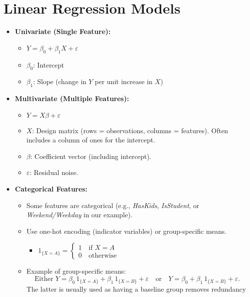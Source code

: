 \documentclass[10pt]{article}
\begin{document}
\section{Linear Regression Models}
\begin{itemize}
    \item \textbf{Univariate (Single Feature):}
    \begin{itemize}
        \item \(\displaystyle Y = \beta_{0} + \beta_{1} X + \varepsilon\)
        \item \(\beta_{0}\): Intercept
        \item \(\beta_{1}\): Slope (change in \(Y\) per unit increase in \(X\))
    \end{itemize}
    \item \textbf{Multivariate (Multiple Features):}
    \begin{itemize}
        \item \(\displaystyle Y = X\beta + \varepsilon\)
        \item \(X\): Design matrix (rows = observations, columns = features). Often includes a column of ones for the intercept.
        \item \(\beta\): Coefficient vector (including intercept).
        \item \(\varepsilon\): Residual noise.
    \end{itemize}
    \item \textbf{Categorical Features:}
    \begin{itemize}
        \item Some features are categorical (e.g., \textit{HasKids}, \textit{IsStudent}, or \textit{Weekend/Weekday} in our example).
        \item Use one-hot encoding (indicator variables) or group-specific means.
        \begin{itemize}
            \item \(\displaystyle 1_{\{X=A\}} = \begin{cases}1 \quad \text{if }X=A \\ 0 \quad \text{otherwise}\end{cases}\)
        \end{itemize}
        \item Example of group-specific means:
        \[
        \text{Either } Y = \beta_{0}\,1_{\{X=A\}} + \beta_{1}\,1_{\{X=B\}} + \varepsilon 
        \quad\text{or}\quad
        Y = \beta_{0} + \beta_{1}\,1_{\{X=B\}} + \varepsilon.
        \]
        The latter is usually used as having a baseline group removes redundancy

\end{itemize}
\end{itemize}
\end{document}
